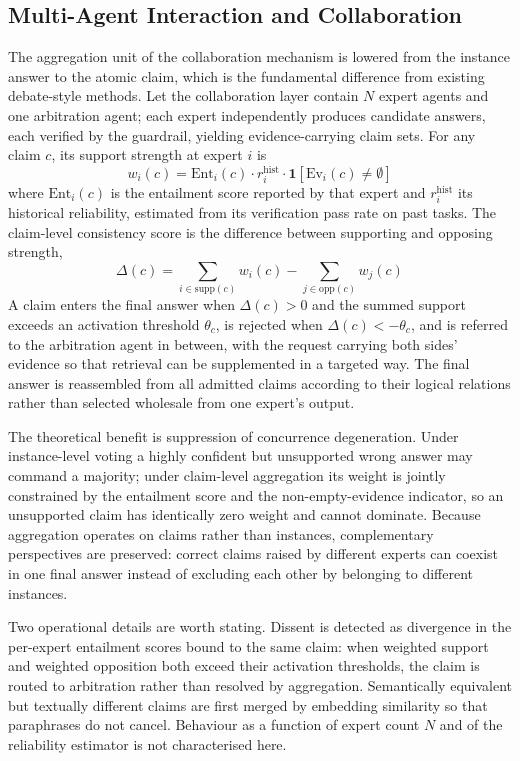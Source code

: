 \documentclass[journal,10pt,a4paper]{IEEEtran}
\begin{document}
\subsection{Multi-Agent Interaction and Collaboration}
\label{sec:collab}
The aggregation unit of the collaboration mechanism is lowered from the instance answer to the atomic claim, which is the fundamental difference from existing debate-style methods. Let the collaboration layer contain $N$ expert agents and one arbitration agent; each expert independently produces candidate answers, each verified by the guardrail, yielding evidence-carrying claim sets. For any claim $c$, its support strength at expert $i$ is
\begin{equation}
w_i(c)=\mathrm{Ent}_i(c)\cdot r_i^{\mathrm{hist}}\cdot\mathbf{1}\!\left[\mathrm{Ev}_i(c)\neq\emptyset\right]
\end{equation}
where $\mathrm{Ent}_i(c)$ is the entailment score reported by that expert and $r_i^{\mathrm{hist}}$ its historical reliability, estimated from its verification pass rate on past tasks. The claim-level consistency score is the difference between supporting and opposing strength,
\begin{equation}
\Delta(c)=\sum_{i\in\mathrm{supp}(c)}w_i(c)-\sum_{j\in\mathrm{opp}(c)}w_j(c)
\end{equation}
A claim enters the final answer when $\Delta(c)>0$ and the summed support exceeds an activation threshold $\theta_c$, is rejected when $\Delta(c)<-\theta_c$, and is referred to the arbitration agent in between, with the request carrying both sides' evidence so that retrieval can be supplemented in a targeted way. The final answer is reassembled from all admitted claims according to their logical relations rather than selected wholesale from one expert's output.

The theoretical benefit is suppression of concurrence degeneration. Under instance-level voting a highly confident but unsupported wrong answer may command a majority; under claim-level aggregation its weight is jointly constrained by the entailment score and the non-empty-evidence indicator, so an unsupported claim has identically zero weight and cannot dominate. Because aggregation operates on claims rather than instances, complementary perspectives are preserved: correct claims raised by different experts can coexist in one final answer instead of excluding each other by belonging to different instances.

Two operational details are worth stating. Dissent is detected as divergence in the per-expert entailment scores bound to the same claim: when weighted support and weighted opposition both exceed their activation thresholds, the claim is routed to arbitration rather than resolved by aggregation. Semantically equivalent but textually different claims are first merged by embedding similarity so that paraphrases do not cancel. Behaviour as a function of expert count $N$ and of the reliability estimator is not characterised here.
\end{document}
